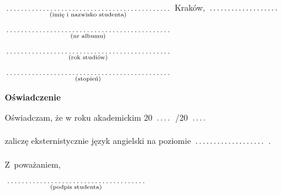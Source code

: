 \documentclass[a4paper,11pt]{article}
\newcommand{\fillField}[2]{
    $\underset{\text{#1}}{\parbox[t]{#2}{\dotfill}}$
}
\begin{document}
\noindent
\fillField{(imię i nazwisko studenta)}{7cm} \hfill Kraków, \fillField{}{3cm}\\\\
\fillField{(nr albumu)}{7cm} \\\\
\fillField{(rok studiów)}{7cm} \\\\
\fillField{(stopień)}{7cm} \\


\vskip 2.0cm

\begin{center}
{\Large \textbf{Oświadczenie}}
\end{center}

\vskip 0.5cm

\noindent
Oświadczam, że w roku akademickim 20\fillField{}{0.7cm}/20\fillField{}{0.7cm}
zaliczę eksternistycznie język angielski na poziomie \fillField{}{3cm}.

\vskip 2.0cm

\hspace{\fill} Z~poważaniem, \hspace{2.8cm} \\\\
\null\hfill\fillField{(podpis studenta)}{6cm}%
\vskip 4.0cm
\end{document}
